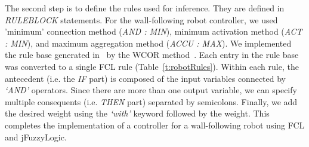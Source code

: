 \documentclass[conference]{IEEEtran}
\begin{document}
The second step is to define the rules used for inference. 
They are defined in \textit{RULEBLOCK} statements.
For the wall-following robot controller, we used 'minimum' connection method (\textit{AND : MIN}), minimum activation method (\textit{ACT : MIN}), and maximum aggregation method (\textit{ACCU : MAX}). 
We implemented the rule base generated in~\cite{mucientes2009learning} by the WCOR method~\cite{Alc06}. 
Each entry in the rule base was converted to a single FCL rule (Table~\ref{t:robotRules}).
Within each rule, the antecedent (i.e. the \textit{IF} part) is composed of the input variables connected by \textit{`AND'} operators.
Since there are more than one output variable, we can specify multiple consequents (i.e. \textit{THEN} part) separated by semicolons. 
Finally, we add the desired weight using the \textit{`with'} keyword followed by the weight. 
This completes the implementation of a controller for a wall-following robot using FCL and jFuzzyLogic.
\end{document}
